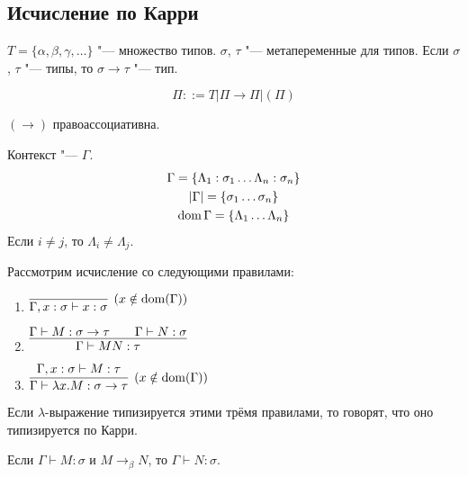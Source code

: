 \subsection{\texorpdfstring{Исчисление по Карри}{Curry-style}}

\begin{definition}[тип]
    $T = \{\alpha, \beta, \gamma, \ldots\}$ "--- множество типов.
    $\sigma$, $\tau$ "--- метапеременные для типов.
    Если $\sigma$, $\tau$ "--- типы, то $\sigma \to \tau$ "--- тип.
    \begin{bnf}
    \[
        \Pi ::= T | \Pi \to \Pi | (\Pi)
    \]
    \end{bnf}
    $\left(\to\right)$ правоассоциативна.
\end{definition}

\begin{definition}[контекст] Контекст "--- $\Gamma$.
\begin{gather*}
    \Gamma = \{ \Lambda_{1} : \sigma_{1} \ldots \Lambda_{n} : \sigma_{n} \} \\
    \left|\Gamma\right| = \{ \sigma_{1} \ldots \sigma_{n} \} \\
    \operatorname{dom} \Gamma = \{ \Lambda_{1} \ldots \Lambda_{n} \}
\end{gather*}
Если $i \neq j$, то $\Lambda_i \neq \Lambda_j$.
\end{definition}

\begin{definition}
    Рассмотрим исчисление со следующими правилами:
    \begin{enumerate}
        \item $\infer[(x \notin \dom(\Gamma))]
            {\Gamma, x:\sigma \vdash x:\sigma}
            {}$
        \item $\infer[]
            {\Gamma \vdash M N : \tau}
            {\Gamma \vdash M:\sigma \to \tau && \Gamma \vdash N:\sigma}$
        \item $\infer[(x \notin \dom(\Gamma))]
            {\Gamma \vdash \lambda x . M : \sigma \to \tau}
            {\Gamma, x : \sigma \vdash M : \tau}$
    \end{enumerate}
    Если $\lambda$-выражение типизируется этими трёмя правилами, то говорят, что оно типизируется по Карри.
\end{definition}

\begin{lemma}
    Если $\Gamma \vdash M : \sigma$ и $M \to_{\beta}N$, то $\Gamma \vdash N : \sigma$.
\end{lemma}

